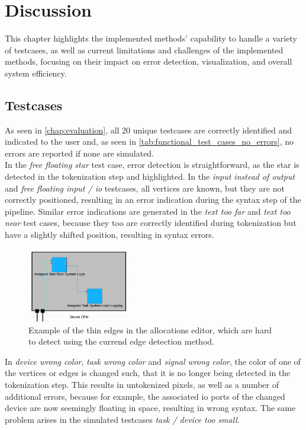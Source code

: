 \chapter{Discussion}
\label{chap:discussion}
This chapter highlights the implemented methods' capability to handle a variety of testcases, as well as current limitations and challenges of the implemented methods, focusing on their impact on error detection, visualization, and overall system efficiency.

\section{Testcases}
As seen in \autoref{chap:evaluation}, all 20 unique testcases are correctly identified and indicated to the user and, as seen in \autoref{tab:functional_test_cases_no_errors}, no errors are reported if none are simulated.\\
In the \textit{free floating star} test case, error detection is straightforward, as the star is detected in the tokenization step and highlighted. In the \textit{input instead of output} and \textit{free floating input / \acrshort{io}} testcases, all vertices are known, but they are not correctly positioned, resulting in an error indication during the syntax step of the pipeline. Similar error indications are generated in the \textit{text too far} and \textit{text too near} test cases, because they too are correctly identified during tokenization but have a slightly shifted position, resulting in syntax errors.

\begin{figure}
    \centering
    \includegraphics[width=0.4\textwidth]{pictures/allocations_thin_edges.png}
    \caption{Example of the thin edges in the allocations editor, which are hard to detect using the currend edge detection method.}
    \label{fig:allocations_thin_edges}
\end{figure}
In \textit{device wrong color}, \textit{task wrong color} and \textit{signal wrong color}, the color of one of the vertices or edges is changed such, that it is no longer being detected in the tokenization step. This results in untokenized pixels, as well as a number of additional errors, because for example, the associated \acrshort{io} ports of the changed device are now seemingly floating in space, resulting in wrong syntax. The same problem arises in the simulated testcases \textit{task / device too small}.

